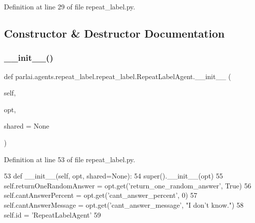 Definition at line 29 of file repeat\+\_\+label.\+py.



\subsection{Constructor \& Destructor Documentation}
\mbox{\label{classparlai_1_1agents_1_1repeat__label_1_1repeat__label_1_1RepeatLabelAgent_ad2a5f628b5ae8d7a6798ef2646d53111}} 
\subsubsection{\texorpdfstring{\+\_\+\+\_\+init\+\_\+\+\_\+()}{\_\_init\_\_()}}
{\footnotesize\ttfamily def parlai.\+agents.\+repeat\+\_\+label.\+repeat\+\_\+label.\+Repeat\+Label\+Agent.\+\_\+\+\_\+init\+\_\+\+\_\+ (\begin{DoxyParamCaption}\item[{}]{self,  }\item[{}]{opt,  }\item[{}]{shared = {\ttfamily None} }\end{DoxyParamCaption})}



Definition at line 53 of file repeat\+\_\+label.\+py.


\begin{DoxyCode}
53     \textcolor{keyword}{def }\_\_init\_\_(self, opt, shared=None):
54         super().\_\_init\_\_(opt)
55         self.returnOneRandomAnswer = opt.get(\textcolor{stringliteral}{'return\_one\_random\_answer'}, \textcolor{keyword}{True})
56         self.cantAnswerPercent = opt.get(\textcolor{stringliteral}{'cant\_answer\_percent'}, 0)
57         self.cantAnswerMessage = opt.get(\textcolor{stringliteral}{'cant\_answer\_message'}, \textcolor{stringliteral}{"I don't know."})
58         self.id = \textcolor{stringliteral}{'RepeatLabelAgent'}
59 
\end{DoxyCode}


